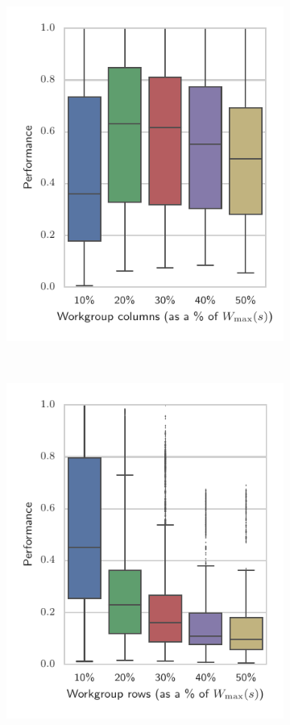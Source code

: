 \documentclass[nonatbib,preprint,nocopyrightspace,9pt]{sigplanconf}
\begin{document}
\begin{figure}
\begin{subfigure}[h]{.48\columnwidth}
    \includegraphics[width=\columnwidth]{img/performance_max_c}
    \vspace{-1.5em} %
    \caption{}
    \label{fig:performance-wg-c}
  \end{subfigure}
  ~%
  \begin{subfigure}[h]{.48\columnwidth}
    \centering
    \includegraphics[width=\columnwidth]{img/performance_max_r}

\end{subfigure}
\end{figure}
\end{document}
